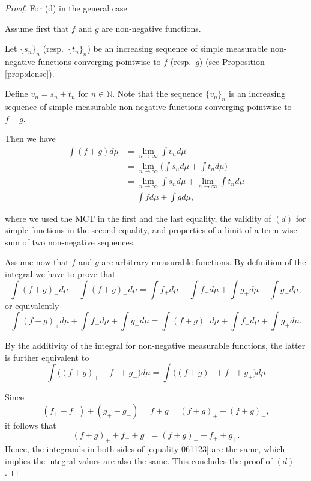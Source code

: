 \documentclass{book}
\theoremstyle{plain}%
\theoremstyle{definition}
\begin{document}
\begin{proof}{For (d) in the general case}

Assume first that $f$ and $g$ are non-negative functions. 

Let $\{s_n\}_n$ (resp.\ $\{t_n\}_n$) be an increasing sequence of simple measurable non-negative functions converging pointwise to $f$ (resp.\ $g$) (see Proposition \ref{prop:dense}).

Define $v_n=s_n+t_n$ for $n\in \mathbb{N}$. Note that the sequence $\{v_n\}_n$ is an increasing sequence of simple measurable non-negative functions converging pointwise to $f+g$. 

Then we have
    \begin{align*}
    \int (f+g) d\mu
    &=
    \lim_{n\to \infty} \int v_n d\mu\\
    &=\lim_{n\to \infty} \Big(\int s_n d\mu + \int t_n d\mu\Big)\\
    &=
    \lim_{n\to \infty} \int s_n d\mu
    +
    \lim_{n\to \infty} \int t_n d\mu\\
    &=
    \int f d\mu + \int g d\mu,
    \end{align*}

where we used the MCT in the first and the last equality, the validity of $(d)$ for simple functions in the second equality, and properties of a limit of a term-wise sum of two non-negative sequences.

Assume now that $f$ and $g$ are arbitrary measurable functions. By definition of the integral we have to prove that
    $$
    \int (f+g)_+d\mu-\int (f+g)_-d\mu
    =
    \int f_+d\mu-\int f_-d\mu
    +
    \int g_+d\mu-\int g_-d\mu,
    $$
    or equivalently
    $$
    \int (f+g)_+d\mu+\int f_-d\mu+\int g_-d\mu
    =
    \int (f+g)_-d\mu
    +
    \int f_+d\mu
    +
    \int g_+d\mu.
    $$

By the additivity of the integral for non-negative measurable functions, the latter is further equivalent to
    \begin{equation}
    \label{equality-061123}
    \int \big((f+g)_++f_-+g_-\big)d\mu
    =
    \int \big((f+g)_-+f_++g_+\big)d\mu
    \end{equation}

Since 
        $$(f_+-f_-)+(g_+-g_-)=f+g=(f+g)_+-(f+g)_-,$$
it follows that
        $$(f+g)_++f_-+g_-=(f+g)_-+f_++g_+.$$
Hence, the integrands in both sides of \eqref{equality-061123} are the same, which implies the integral values are also the same. This concludes the proof of $(d)$.
\end{proof}
\end{document}
